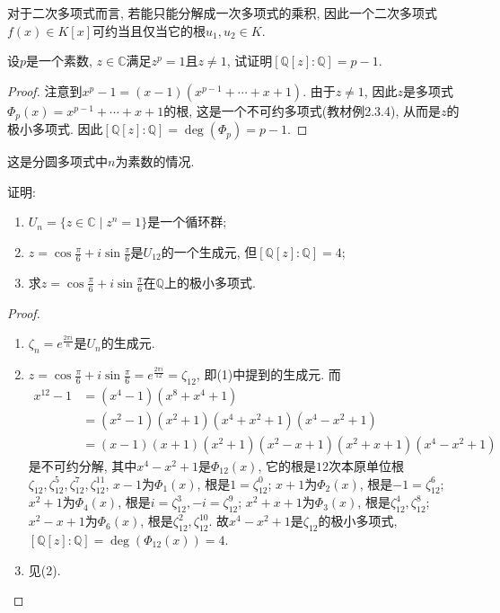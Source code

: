\begin{remark}
    对于二次多项式而言, 若能只能分解成一次多项式的乘积, 因此一个二次多项式$f(x) \in K[x]$可约当且仅当它的根$u_1, u_2 \in K$.
\end{remark}

\begin{problem}\label{ex:3.1.5}
    设$p$是一个素数, $z \in \mathbb{C}$满足$z^p = 1$且$z \neq 1$, 试证明$[\mathbb{Q}[z]:\mathbb{Q}] = p - 1$.
\end{problem}

\begin{proof}
    注意到$x^p - 1 = (x - 1)(x^{p - 1} + \cdots + x + 1)$. 由于$z \neq 1$, 因此$z$是多项式$\Phi_p(x) = x^{p - 1} + \cdots + x + 1$的根, 这是一个不可约多项式(教材例2.3.4), 从而是$z$的极小多项式. 因此$[\mathbb{Q}[z]:\mathbb{Q}] = \deg(\Phi_p) = p - 1$.
\end{proof}

\begin{remark}
    这是分圆多项式中$n$为素数的情况.
\end{remark}

\begin{problem}\label{ex:3.1.6}
    证明:
    \begin{enumerate}[(1)]
        \item $U_n = \{z \in \mathbb{C} \mid z^n = 1\}$是一个循环群;
        \item $z = \cos \frac\pi6 + i\sin \frac\pi6$是$U_{12}$的一个生成元, 但$[\mathbb{Q}[z]:\mathbb{Q}] = 4$;
        \item 求$z = \cos \frac\pi6 + i\sin \frac\pi6$在$\mathbb{Q}$上的极小多项式.
    \end{enumerate}
\end{problem}

\begin{proof}
    \begin{enumerate}[(1)]
        \item $\zeta_n = e^{\frac{2\pi i}{n}}$是$U_n$的生成元.
        \item $z = \cos \frac\pi6 + i\sin \frac\pi6 = e^\frac{2\pi i}{12} = \zeta_{12}$, 即(1)中提到的生成元. 而
        \[
        \begin{aligned}
            x^{12} - 1 &= (x^4 - 1)(x^8 + x^4 + 1)\\
            &= (x^2 - 1)(x^2 + 1)(x^4 + x^2 + 1)(x^4 - x^2 + 1)\\
            &= (x - 1)(x + 1)(x^2 + 1)(x^2 - x + 1)(x^2 + x + 1)(x^4 - x^2 + 1)
        \end{aligned}
        \]
        是不可约分解, 其中$x^4 - x^2 + 1$是$\Phi_{12}(x)$, 它的根是$12$次本原单位根$\zeta_{12}, \zeta_{12}^5, \zeta_{12}^7, \zeta_{12}^{11}$, $x - 1$为$\Phi_1(x)$, 根是$1 = \zeta_{12}^0$; $x + 1$为$\Phi_2(x)$, 根是$-1 = \zeta_{12}^6$; $x^2 + 1$为$\Phi_4(x)$, 根是$i = \zeta_{12}^3, -i = \zeta_{12}^9$; $x^2 + x + 1$为$\Phi_3(x)$, 根是$\zeta_{12}^4, \zeta_{12}^8$; $x^2 - x + 1$为$\Phi_6(x)$, 根是$\zeta_{12}^2, \zeta_{12}^{10}$. 故$x^4 - x^2 + 1$是$\zeta_{12}$的极小多项式, $[\mathbb{Q}[z]:\mathbb{Q}] = \deg(\Phi_{12}(x)) = 4$. 
        \item 见(2).
    \end{enumerate}
\end{proof}

